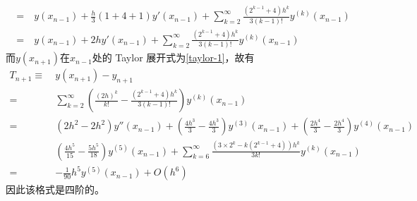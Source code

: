 \documentclass[11pt]{article}
\begin{document}
\begin{question}
{\begin{align*}
            =\            & y(x_{n - 1}) + \frac{h}{3}(1 + 4 + 1)y'(x_{n - 1}) + \sum_{k = 2}^{\infty}\frac{(2^{k - 1} + 4)h^k}{3(k - 1)!}y^{(k)}(x_{n - 1}) \\
            =\            & y(x_{n - 1}) + 2hy'(x_{n - 1}) + \sum_{k = 2}^{\infty}\frac{(2^{k - 1} + 4)h^k}{3(k - 1)!}y^{(k)}(x_{n - 1})
        \end{align*}
        而$y(x_{n + 1})$在$x_{n - 1}$处的 Taylor 展开式为\eqref{taylor-1}，故有
        \begin{align*}
            T_{n + 1} \equiv\  & y(x_{n + 1}) - y_{n + 1}                                                                                                                                                         \\
            =\                 & \sum_{k = 2}^{\infty}\left(\frac{(2h)^k}{k!} - \frac{(2^{k - 1} + 4)h^k}{3(k - 1)!}\right)y^{(k)}(x_{n - 1})                                                                     \\
            =\                 & \left(2h^2 - 2h^2\right)y''(x_{n - 1}) + \left(\frac{4h^3}{3} - \frac{4h^3}{3}\right)y^{(3)}(x_{n - 1}) + \left(\frac{2h^4}{3} - \frac{2h^4}{3}\right)y^{(4)}(x_{n - 1})         \\
                               & \left(\frac{4h^5}{15} - \frac{5h^5}{18}\right)y^{(5)}(x_{n - 1}) + \sum_{k = 6}^{\infty}\frac{\left(3 \times 2^k - k\left(2^{k - 1} + 4\right)\right)h^k}{3k!}y^{(k)}(x_{n - 1}) \\
            =\                 & -\frac{1}{90}h^5y^{(5)}(x_{n - 1}) + O(h^6)
        \end{align*}
        因此该格式是四阶的。


    }
\end{question}
\end{document}
